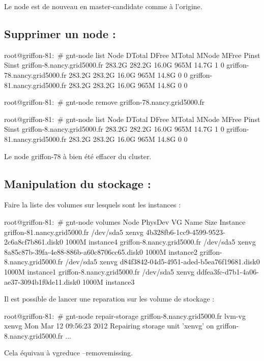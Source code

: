 Le node est de nouveau en master-candidate comme à l'origine.

\subsection {Supprimer un node :}

root@griffon-81:~# gnt-node list
Node                         DTotal  DFree MTotal MNode MFree Pinst Sinst
griffon-8.nancy.grid5000.fr  283.2G 282.2G  16.0G  965M 14.7G     1     0
griffon-78.nancy.grid5000.fr 283.2G 283.2G  16.0G  965M 14.8G     0     0
griffon-81.nancy.grid5000.fr 283.2G 283.2G  16.0G  965M 14.8G     0     0

root@griffon-81:~# gnt-node remove griffon-78.nancy.grid5000.fr

root@griffon-81:~# gnt-node list
Node                         DTotal  DFree MTotal MNode MFree Pinst Sinst
griffon-8.nancy.grid5000.fr  283.2G 282.2G  16.0G  965M 14.7G     1     0
griffon-81.nancy.grid5000.fr 283.2G 283.2G  16.0G  965M 14.8G     0     0

Le node griffon-78 à bien été effacer du cluster.

\subsection {Manipulation du stockage :}

Faire la liste des volumes sur lesquels sont les instances : 

root@griffon-81:~# gnt-node volumes
Node                         PhysDev   VG    Name                                        Size Instance 
griffon-81.nancy.grid5000.fr /dev/sda5 xenvg 4b328fb6-1cc9-4599-9523-2c6a8cf7b861.disk0 1000M instance4
griffon-8.nancy.grid5000.fr  /dev/sda5 xenvg 8a85c87b-39fa-4e88-886b-a60c8706cc65.disk0 1000M instance2
griffon-8.nancy.grid5000.fr  /dev/sda5 xenvg d84f3842-04d5-4951-aded-b5ea76f19681.disk0 1000M instance1
griffon-8.nancy.grid5000.fr  /dev/sda5 xenvg ddfea3fc-d7b1-4a06-ae37-3094b1f0de11.disk0 1000M instance3

Il est possible de lancer une reparation sur les volume de stockage :

root@griffon-81:~# gnt-node repair-storage griffon-8.nancy.grid5000.fr lvm-vg xenvg
Mon Mar 12 09:56:23 2012 Repairing storage unit 'xenvg' on griffon-8.nancy.grid5000.fr ...

Cela équivau à vgreduce --removemissing.


